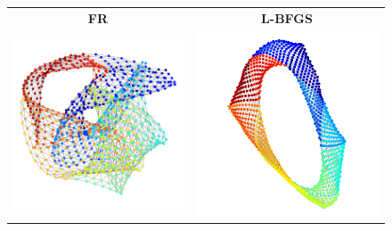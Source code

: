 \documentclass[dvipdfmx,10pt,journal,compsoc]{IEEEtran}
\begin{document}
\begin{figure}[t]
    \centering
    \begin{tabular}{cc}
        \large{\textbf{\textsf{FR}}}                                       & \large{\textbf{\textsf{L-BFGS}}}   \\
        \begin{minipage}{0.45\columnwidth}
            \centering
            \includegraphics[width=0.85\columnwidth]{jagmesh1/jagmesh1_FR.png}
        \end{minipage} &
        \begin{minipage}{0.45\columnwidth}
            \centering
            \includegraphics[width=0.85\columnwidth]{jagmesh1/jagmesh1_L_BFGS.png}

\end{minipage}
\end{tabular}
\end{figure}
\end{document}
